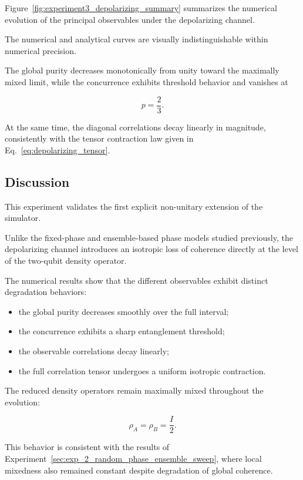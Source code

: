 Figure~\ref{fig:experiment3_depolarizing_summary} summarizes the numerical evolution of the principal observables under the depolarizing channel.


The numerical and analytical curves are visually indistinguishable within numerical precision.

The global purity decreases monotonically from unity toward the maximally mixed limit, while the concurrence exhibits threshold behavior and vanishes at

\[
p
=
\frac{2}{3}.
\]

At the same time, the diagonal correlations decay linearly in magnitude, consistently with the tensor contraction law given in Eq.~\eqref{eq:depolarizing_tensor}.


\subsection*{Discussion}

This experiment validates the first explicit non-unitary extension of the simulator.

Unlike the fixed-phase and ensemble-based phase models studied previously, the depolarizing channel introduces an isotropic loss of coherence directly at the level of the two-qubit density operator.

The numerical results show that the different observables exhibit distinct degradation behaviors:

\begin{itemize}
    \item the global purity decreases smoothly over the full interval;
    \item the concurrence exhibits a sharp entanglement threshold;
    \item the observable correlations decay linearly;
    \item the full correlation tensor undergoes a uniform isotropic contraction.
\end{itemize}

The reduced density operators remain maximally mixed throughout the evolution:

\[
\rho_A
=
\rho_B
=
\frac{I}{2}.
\]

This behavior is consistent with the results of Experiment~\ref{sec:exp_2_random_phase_ensemble_sweep}, 
where local mixedness also remained constant despite degradation of global coherence.

